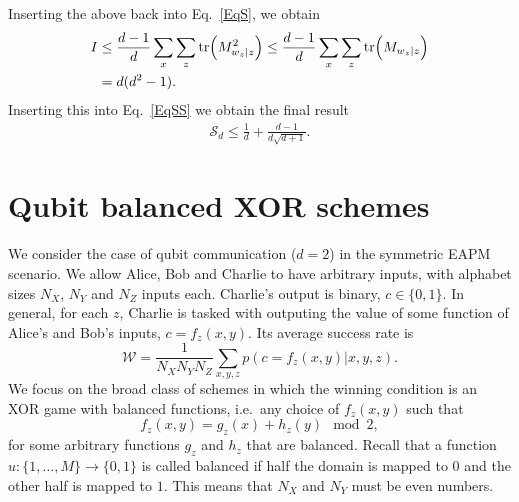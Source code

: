 \documentclass[aps,superscriptaddress,twocolumn,twoside,floatfix,pra,nofootinbib,a4paper]{revtex4-2}
\begin{document}
Inserting the above back into Eq.~\eqref{EqS}, we obtain
\begin{align}\nonumber
I&\leq  \frac{d-1}{d}\sum_x \sum_{z} \tr(M_{w_z|z}^2)\leq \frac{d-1}{d}\sum_x \sum_{z} \tr(M_{w_z|z})\\
&=d(d^2-1).
\end{align}
Inserting this into Eq.~\eqref{EqSS} we obtain the final result
\begin{align}
\mathcal{S}_d\leq \frac{1}{d}+\frac{d-1}{d\sqrt{d+1}}.
\end{align}






\section{Qubit balanced XOR schemes}\label{App:qubitproof}
We consider the case of qubit communication ($d=2$) in the symmetric EAPM scenario. We allow Alice, Bob and Charlie to have arbitrary inputs, with alphabet sizes $N_X$, $N_Y$ and $N_Z$ inputs each. Charlie's output is binary,  $c\in\{0,1\}$. In general, for each $z$, Charlie is tasked with outputing the value of some function of Alice's and Bob's inputs, $c=f_z(x,y)$. Its average success rate is
\begin{equation}
\mathcal{W}=\frac{1}{N_X N_YN_Z}\sum_{x,y,z}p(c=f_z(x,y)|x,y,z).
\label{eq: av success qubit}
\end{equation}
We focus on the broad class of schemes in which the winning condition is an XOR game with balanced functions, i.e.~any choice of $f_z(x,y)$ such that 
\begin{equation}
    f_z(x,y)=g_z(x)+ h_z(y) \mod{2},
\end{equation}
for some arbitrary functions $g_z$ and $h_z$ that are balanced. Recall that a function $u:\{1,\ldots,M\}\rightarrow \{0,1\}$ is called balanced if half the domain is mapped to $0$ and the other half is mapped to $1$. This means that $N_X$ and $N_Y$ must be even numbers.
\end{document}
